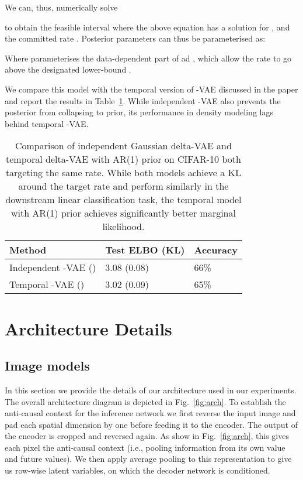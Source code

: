 \documentclass{article} \usepackage{iclr2019_conference,times}
\def\figref#1{figure~\ref{#1}}
\renewcommand{\figref}[1]{Fig.~\ref{#1}}
\newcommand{\tblref}[1]{Table~\ref{#1}}
\begin{document}
We can, thus, numerically solve 

to obtain the feasible interval  where the above equation has a solution for , and the committed rate . Posterior parameters can thus be parameterised as:

Where  parameterises the data-dependent part of  ad , which allow the rate to go above the designated lower-bound . 

We compare this model with the temporal version of -VAE discussed in the paper and report the results in \tblref{tbl:indep-ablation}. While independent -VAE also prevents the posterior from collapsing to prior, its performance in density modeling lags behind temporal -VAE. 

\begin{table}[h]
    \centering
    \begin{tabular}{l|ll}
        \textbf{Method} &  Test ELBO (KL)     &  Accuracy  \\
        \toprule
         Independent -VAE  () & 3.08 (0.08) & 66\% \\
         Temporal -VAE  () & 3.02 (0.09)    & 65\% \\
         \bottomrule
    \end{tabular}
    \caption{Comparison of independent Gaussian delta-VAE and temporal delta-VAE with AR(1) prior on CIFAR-10 both targeting the same rate. While both models achieve a KL around the target rate and perform similarly in the downstream linear classification task, the temporal model with AR(1) prior achieves significantly better marginal likelihood.}
    \label{tbl:indep-ablation}
\end{table}

\section{Architecture Details}\label{app:arch}

\subsection{Image models}

In this section we provide the details of our architecture used in our experiments. The overall architecture diagram is depicted in
\figref{fig:arch}. To establish the anti-causal context for the inference network we first reverse the input image and pad each spatial dimension by one before feeding it to the encoder. The output of the encoder is cropped and reversed again. As show in \figref{fig:arch}, this gives each pixel the anti-causal context (i.e., pooling information from its own value and future values). We then apply average pooling to this representation to give us row-wise latent variables, on which the decoder network is conditioned. 
\end{document}
